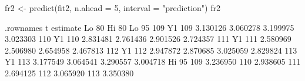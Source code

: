 \begin{Schunk}
\begin{Sinput}
 fr2 <- predict(fit2, n.ahead = 5, interval = "prediction")
 fr2
\end{Sinput}
\begin{Soutput}
    .rownames   t estimate    Lo 80    Hi 80    Lo 95
109        Y1 109 3.130126 3.060278 3.199975 3.023303
110        Y1 110 2.831481 2.761436 2.901526 2.724357
111        Y1 111 2.580969 2.506980 2.654958 2.467813
112        Y1 112 2.947872 2.870685 3.025059 2.829824
113        Y1 113 3.177549 3.064541 3.290557 3.004718
       Hi 95
109 3.236950
110 2.938605
111 2.694125
112 3.065920
113 3.350380
\end{Soutput}
\end{Schunk}

